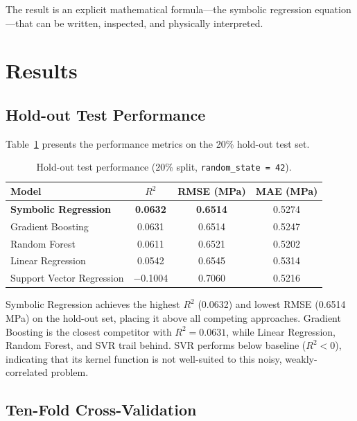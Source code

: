 \documentclass[12pt,a4paper]{article}
\begin{document}
The result is an explicit mathematical formula---the symbolic regression
equation---that can be written, inspected, and physically interpreted.

\section{Results}
\label{sec:results}

\subsection{Hold-out Test Performance}
\label{subsec:holdout}

Table~\ref{tab:holdout} presents the performance metrics on the 20\% hold-out
test set.

\begin{table}[H]
  \centering
  \caption{Hold-out test performance (20\% split, \texttt{random\_state = 42}).}
  \label{tab:holdout}
  \begin{tabular}{lccc}
    \toprule
    \textbf{Model} & \textbf{$R^{2}$} & \textbf{RMSE (MPa)}
      & \textbf{MAE (MPa)} \\
    \midrule
    \textbf{Symbolic Regression} & \textbf{0.0632} & \textbf{0.6514} & 0.5274 \\
    Gradient Boosting            & 0.0631           & 0.6514           & 0.5247 \\
    Random Forest                & 0.0611           & 0.6521           & 0.5202 \\
    Linear Regression            & 0.0542           & 0.6545           & 0.5314 \\
    Support Vector Regression    & $-$0.1004        & 0.7060           & 0.5216 \\
    \bottomrule
  \end{tabular}
\end{table}

Symbolic Regression achieves the highest $R^{2}$ (0.0632) and lowest RMSE
(0.6514 MPa) on the hold-out set, placing it above all competing approaches.
Gradient Boosting is the closest competitor with $R^{2} = 0.0631$, while Linear
Regression, Random Forest, and SVR trail behind. SVR performs below baseline
($R^{2} < 0$), indicating that its kernel function is not well-suited to this
noisy, weakly-correlated problem.

\subsection{Ten-Fold Cross-Validation}
\label{subsec:cv}
\end{document}

